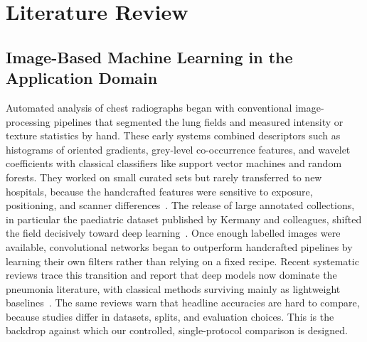\documentclass[preprint,12pt]{elsarticle}
\begin{document}
\section{Literature Review}

\subsection{Image-Based Machine Learning in the Application Domain}
Automated analysis of chest radiographs began with conventional image-processing pipelines that segmented the lung fields and measured intensity or texture statistics by hand.
These early systems combined descriptors such as histograms of oriented gradients, grey-level co-occurrence features, and wavelet coefficients with classical classifiers like support vector machines and random forests.
They worked on small curated sets but rarely transferred to new hospitals, because the handcrafted features were sensitive to exposure, positioning, and scanner differences~\cite{aitnasser2023review}.
The release of large annotated collections, in particular the paediatric dataset published by Kermany and colleagues, shifted the field decisively toward deep learning~\cite{kermany2018identifying}.
Once enough labelled images were available, convolutional networks began to outperform handcrafted pipelines by learning their own filters rather than relying on a fixed recipe.
Recent systematic reviews trace this transition and report that deep models now dominate the pneumonia literature, with classical methods surviving mainly as lightweight baselines~\cite{guleria2024systematic,vyas2026systematic}.
The same reviews warn that headline accuracies are hard to compare, because studies differ in datasets, splits, and evaluation choices.
This is the backdrop against which our controlled, single-protocol comparison is designed.
\end{document}
